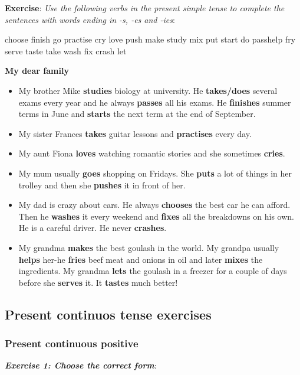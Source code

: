 \textbf{Exercise}: \textit{Use the following verbs in the present simple tense to complete the sentences with words ending in -s, -es and -ies}:

choose finish go practise cry love push make study mix put start do passhelp fry serve taste take wash fix crash let

\textbf{My dear family}

\begin{itemize}

\item My brother Mike \textbf{studies} biology at university. He \textbf{takes/does} several exams every year and he always \textbf{passes} all his exams. He \textbf{finishes} summer terms in June and \textbf{starts} the next term at the end of September.
\item My sister Frances \textbf{takes} guitar lessons and \textbf{practises} every day.
\item My aunt Fiona \textbf{loves} watching romantic stories and she sometimes \textbf{cries}.
\item My mum usually \textbf{goes} shopping on Fridays. She \textbf{puts} a lot of things in her trolley and then she \textbf{pushes} it in front of her.
\item My dad is crazy about cars. He always \textbf{chooses} the best car he can afford. Then he
\textbf{washes} it every weekend and \textbf{fixes} all the breakdowns on his own. He is a careful driver. He never \textbf{crashes}.
\item My grandma \textbf{makes} the best goulash in the world. My grandpa usually \textbf{helps} her-he \textbf{fries} beef meat and onions in oil and later \textbf{mixes} the ingredients. My grandma \textbf{lets} the goulash in a freezer for a couple of days before she \textbf{serves} it. It \textbf{tastes} much better!

\end{itemize}

\subsection{Present continuos tense exercises}

\subsubsection{Present continuous positive}

\textbf{\textit{Exercise 1: Choose the correct form}}:

